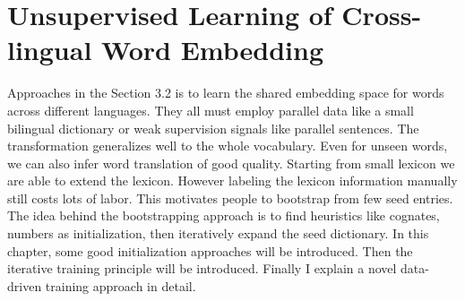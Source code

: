 \chapter{Unsupervised Learning of Cross-lingual Word Embedding}

Approaches in the Section 3.2 is to learn the shared embedding space for words across different languages. They all must employ parallel data like a small bilingual dictionary or weak supervision signals like parallel sentences. The transformation generalizes well to the whole vocabulary. Even for unseen words, we can also infer word translation of good quality. Starting from small lexicon we are able to extend the lexicon. However labeling the lexicon information manually still costs lots of labor. This motivates people to bootstrap from few seed entries. The idea behind the bootstrapping approach is to find heuristics like cognates, numbers as initialization, then iteratively expand the seed dictionary. In this chapter, some good initialization approaches will be introduced. Then the iterative training principle will be introduced. Finally I explain a novel data-driven training approach in detail.

%
%
%
%
%
%
%
